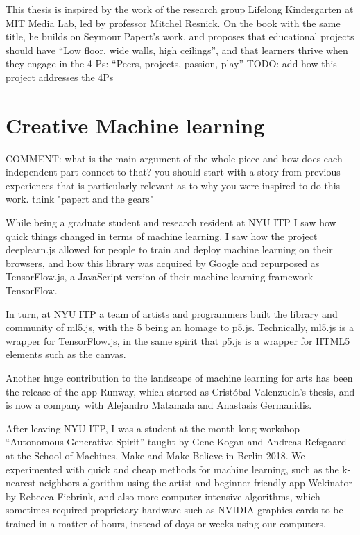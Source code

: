 This thesis is inspired by the work of the research group Lifelong Kindergarten at MIT Media Lab, led by professor Mitchel Resnick. On the book with the same title, he builds on Seymour Papert’s work, and proposes that educational projects should have “Low floor, wide walls, high ceilings”, and that learners thrive when they engage in the 4 Ps: “Peers, projects, passion, play”
TODO: add how this project addresses the 4Ps

\section{Creative Machine learning}

COMMENT: what is the main argument of the whole piece and how does each independent part connect to that? you should start with a story from previous experiences that is particularly relevant as to why you were inspired to do this work. think "papert and the gears"

While being a graduate student and research resident at NYU ITP I saw how quick things changed in terms of machine learning. I saw how the project deeplearn.js allowed for people to train and deploy machine learning on their browsers, and how this library was acquired by Google and repurposed as TensorFlow.js, a JavaScript version of their machine learning framework TensorFlow.

In turn, at NYU ITP a team of artists and programmers built the library and community of ml5.js, with the 5 being an homage to p5.js. Technically, ml5.js is a wrapper for TensorFlow.js, in the same spirit that p5.js is a wrapper for HTML5 elements such as the canvas.

Another huge contribution to the landscape of machine learning for arts has been the release of the app Runway, which started as Cristóbal Valenzuela’s thesis, and is now a company with Alejandro Matamala and Anastasis Germanidis.

After leaving NYU ITP, I was a student at the month-long workshop “Autonomous Generative Spirit” taught by Gene Kogan and Andreas Refsgaard at the School of Machines, Make and Make Believe in Berlin 2018. We experimented with quick and cheap methods for machine learning, such as the k-nearest neighbors algorithm using the artist and beginner-friendly app Wekinator by Rebecca Fiebrink, and also more computer-intensive algorithms, which sometimes required proprietary hardware such as NVIDIA graphics cards to be trained in a matter of hours, instead of days or weeks using our computers.

